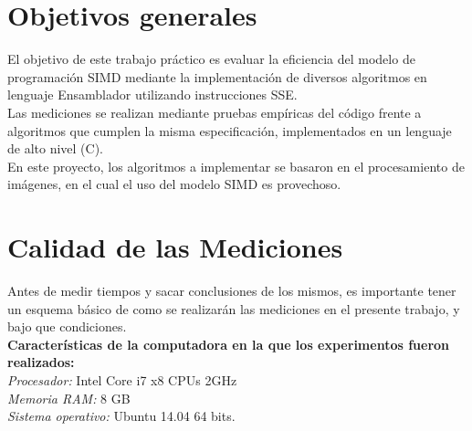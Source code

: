 \documentclass[10pt,a4paper,spanish]{article}
\begin{document}


\maketitle

\newpage

\tableofcontents

\clearpage

\section{Objetivos generales}

El objetivo de este trabajo práctico es evaluar la eficiencia del modelo de programación SIMD mediante la implementación de diversos algoritmos en lenguaje Ensamblador utilizando instrucciones SSE. \\
\indent Las mediciones se realizan mediante pruebas empíricas del código frente a algoritmos que cumplen la misma especificación, implementados en un lenguaje de alto nivel (C). \\
\indent En este proyecto, los algoritmos a implementar se basaron en el procesamiento de imágenes, en el cual el uso del modelo SIMD es provechoso.

\section{Calidad de las Mediciones}
Antes de medir tiempos y sacar conclusiones de los mismos, es importante tener un esquema básico de como se realizarán las mediciones en el presente trabajo, y bajo que condiciones. \\

\textbf{Características de la computadora en la que los experimentos fueron realizados:} \\
\textit{Procesador:} Intel Core i7 x8 CPUs 2GHz \\
\textit{Memoria RAM:} 8 GB \\
\textit{Sistema operativo:} Ubuntu 14.04 64 bits. \\
\end{document}

